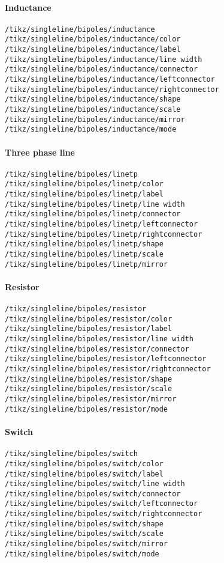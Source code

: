 \documentclass[a4]{article}
\begin{document}
\begin{footnotesize}
\paragraph{Inductance}
\begin{verbatim}
/tikz/singleline/bipoles/inductance
/tikz/singleline/bipoles/inductance/color
/tikz/singleline/bipoles/inductance/label
/tikz/singleline/bipoles/inductance/line width
/tikz/singleline/bipoles/inductance/connector
/tikz/singleline/bipoles/inductance/leftconnector
/tikz/singleline/bipoles/inductance/rightconnector
/tikz/singleline/bipoles/inductance/shape
/tikz/singleline/bipoles/inductance/scale
/tikz/singleline/bipoles/inductance/mirror
/tikz/singleline/bipoles/inductance/mode
\end{verbatim}
\paragraph{Three phase line}
\begin{verbatim}
/tikz/singleline/bipoles/linetp
/tikz/singleline/bipoles/linetp/color
/tikz/singleline/bipoles/linetp/label
/tikz/singleline/bipoles/linetp/line width
/tikz/singleline/bipoles/linetp/connector
/tikz/singleline/bipoles/linetp/leftconnector
/tikz/singleline/bipoles/linetp/rightconnector
/tikz/singleline/bipoles/linetp/shape
/tikz/singleline/bipoles/linetp/scale
/tikz/singleline/bipoles/linetp/mirror
\end{verbatim}
\paragraph{Resistor}
\begin{verbatim}
/tikz/singleline/bipoles/resistor
/tikz/singleline/bipoles/resistor/color
/tikz/singleline/bipoles/resistor/label
/tikz/singleline/bipoles/resistor/line width
/tikz/singleline/bipoles/resistor/connector
/tikz/singleline/bipoles/resistor/leftconnector
/tikz/singleline/bipoles/resistor/rightconnector
/tikz/singleline/bipoles/resistor/shape
/tikz/singleline/bipoles/resistor/scale
/tikz/singleline/bipoles/resistor/mirror
/tikz/singleline/bipoles/resistor/mode
\end{verbatim}
\paragraph{Switch}
\begin{verbatim}
/tikz/singleline/bipoles/switch
/tikz/singleline/bipoles/switch/color
/tikz/singleline/bipoles/switch/label
/tikz/singleline/bipoles/switch/line width
/tikz/singleline/bipoles/switch/connector
/tikz/singleline/bipoles/switch/leftconnector
/tikz/singleline/bipoles/switch/rightconnector
/tikz/singleline/bipoles/switch/shape
/tikz/singleline/bipoles/switch/scale
/tikz/singleline/bipoles/switch/mirror
/tikz/singleline/bipoles/switch/mode
\end{verbatim}

\end{footnotesize}
\end{document}
